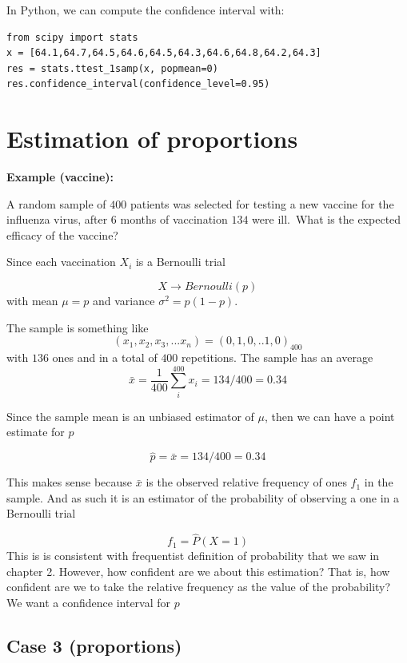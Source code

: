 \documentclass[
]{book}
\begin{document}
In Python, we can compute the confidence interval with:

\begin{verbatim}
from scipy import stats
x = [64.1,64.7,64.5,64.6,64.5,64.3,64.6,64.8,64.2,64.3]
res = stats.ttest_1samp(x, popmean=0)
res.confidence_interval(confidence_level=0.95)
\end{verbatim}

\hypertarget{estimation-of-proportions}{%
\section{Estimation of proportions}\label{estimation-of-proportions}}

\textbf{Example (vaccine):}

A random sample of \(400\) patients was selected for testing a new vaccine for the influenza virus, after \(6\) months of vaccination \(134\) were ill.~What is the expected efficacy of the vaccine?

Since each vaccination \(X_i\) is a Bernoulli trial

\[X \rightarrow Bernoulli(p)\]
with mean \(\mu=p\) and variance \(\sigma^2=p(1-p)\).

The sample is something like
\[(x_1,x_2, x_3, ...x_n)=(0,1,0,.. 1, 0)_{400}\] with \(136\) ones and in a total of \(400\) repetitions. The sample has an average \[\bar{x}=\frac{1}{400}\sum_i^{400} x_i=134/400=0.34\]

Since the sample mean is an unbiased estimator of \(\mu\), then we can have a point estimate for \(p\)

\[\hat{p}=\bar{x}=134/400=0.34\]

This makes sense because \(\bar{x}\) is the observed relative frequency of ones \(f_1\) in the sample. And as such it is an estimator of the probability of observing a one in a Bernoulli trial

\[f_1 =\hat{P}(X=1)\]
This is is consistent with frequentist definition of probability that we saw in chapter 2. However, how confident are we about this estimation? That is, how confident are we to take the relative frequency as the value of the probability? We want a confidence interval for \(p\)

\hypertarget{case-3-proportions}{%
\subsection{Case 3 (proportions)}\label{case-3-proportions}}
\end{document}
